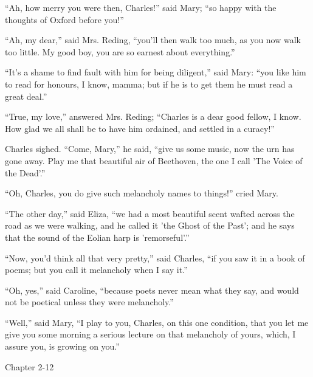 ``Ah, how merry you were then, Charles!'' said Mary;
``so happy with the thoughts of Oxford before you!''

``Ah, my dear,'' said Mrs. Reding, ``you'll then walk
too much, as you now walk too little. My good boy, you are so earnest
about everything.''

``It's a shame to find fault with him for being diligent,''
said Mary: ``you like him to read for honours, I know, mamma; but
if he is to get them he must read a great deal.''

``True, my love,'' answered Mrs. Reding; ``Charles is a
dear good fellow, I know. How glad we all shall be to have him
ordained, and settled in a curacy!''

Charles sighed. ``Come, Mary,'' he said, ``give us some
music, now the urn has gone away. Play me that beautiful air of
Beethoven, the one I call 'The Voice of the Dead'.''

``Oh, Charles, you do give such melancholy names to
things!'' cried Mary.

``The other day,'' said Eliza, ``we had a most
beautiful scent wafted across the road as we were walking, and he
called it 'the Ghost of the Past'; and he says that the sound of the
Eolian harp is 'remorseful'.''

``Now, you'd think all that very pretty,'' said Charles,
``if you saw it in a book of poems; but you call it melancholy
when I say it.''

``Oh, yes,'' said Caroline, ``because poets never mean
what they say, and would not be poetical unless they were
melancholy.''

``Well,'' said Mary, ``I play to you, Charles, on this
one condition, that you let me give you some morning a serious lecture
on that melancholy of yours, which, I assure you, is growing on
you.''

Chapter 2-12


